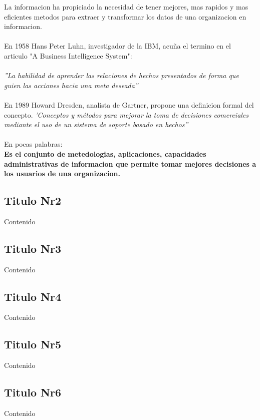 \documentclass[twoside,twocolumn]{article}
\begin{document}
La informacion ha propiciado la necesidad de tener mejores, mas rapidos y mas eficientes metodos para extraer y transformar los datos de una organizacion en informacion.
\\ \\
En 1958 Hans Peter Luhn, investigador de la IBM, acuña el termino en el articulo "A Business Intelligence System":
\\ \\
\textsl{''La habilidad de aprender las relaciones de hechos presentados de forma que guien las acciones hacia una meta deseada''}
\\ \\
En 1989 Howard Dresden, analista de Gartner, propone una definicion formal del concepto.
\textsl{'Conceptos y métodos para mejorar la toma de decisiones comerciales mediante el uso de un sistema de soporte basado en hechos''}
\\ \\
En pocas palabras: \\
\textbf{Es el conjunto de metedologias, aplicaciones, capacidades administrativas de informacion que permite tomar mejores decisiones a los usuarios de una organizacion.}


\subsection{Titulo Nr2}

Contenido

\subsection{Titulo Nr3}

Contenido
 
\subsection{Titulo Nr4}

Contenido

\subsection{Titulo Nr5}

Contenido

\subsection{Titulo Nr6}
Contenido
\end{document}

